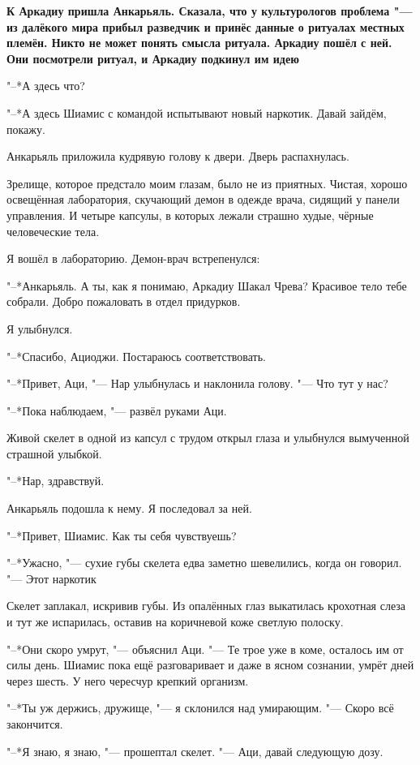 \textbf{К Аркадиу пришла Анкарьяль.
Сказала, что у культурологов проблема "--- из далёкого мира прибыл разведчик и принёс данные о ритуалах местных племён.
Никто не может понять смысла ритуала.
Аркадиу пошёл с ней.
Они посмотрели ритуал, и Аркадиу подкинул им идею}

"--*А здесь что?

"--*А здесь Шиамис с командой испытывают новый наркотик.
Давай зайдём, покажу.

Анкарьяль приложила кудрявую голову к двери.
Дверь распахнулась.

Зрелище, которое предстало моим глазам, было не из приятных.
Чистая, хорошо освещённая лаборатория, скучающий демон в одежде врача, сидящий у панели управления.
И четыре капсулы, в которых лежали страшно худые, чёрные человеческие тела.

Я вошёл в лабораторию.
Демон-врач встрепенулся:

"--*Анкарьяль.
А ты, как я понимаю, Аркадиу Шакал Чрева?
Красивое тело тебе собрали.
Добро пожаловать в отдел придурков.

Я улыбнулся.

"--*Спасибо, Ациоджи.
Постараюсь соответствовать.

"--*Привет, Аци, "--- Нар улыбнулась и наклонила голову.
"--- Что тут у нас?

"--*Пока наблюдаем, "--- развёл руками Аци.

Живой скелет в одной из капсул с трудом открыл глаза и улыбнулся вымученной страшной улыбкой.

"--*Нар, здравствуй.

Анкарьяль подошла к нему.
Я последовал за ней.

"--*Привет, Шиамис.
Как ты себя чувствуешь?

"--*Ужасно, "--- сухие губы скелета едва заметно шевелились, когда он говорил.
"--- Этот наркотик\ldotst

Скелет заплакал, искривив губы.
Из опалённых глаз выкатилась крохотная слеза и тут же испарилась, оставив на коричневой коже светлую полоску.

"--*Они скоро умрут, "--- объяснил Аци.
"--- Те трое уже в коме, осталось им от силы день.
Шиамис пока ещё разговаривает и даже в ясном сознании, умрёт дней через шесть.
У него чересчур крепкий организм.

"--*Ты уж держись, дружище, "--- я склонился над умирающим.
"--- Скоро всё закончится.

"--*Я знаю, я знаю, "--- прошептал скелет.
"--- Аци, давай следующую дозу.

